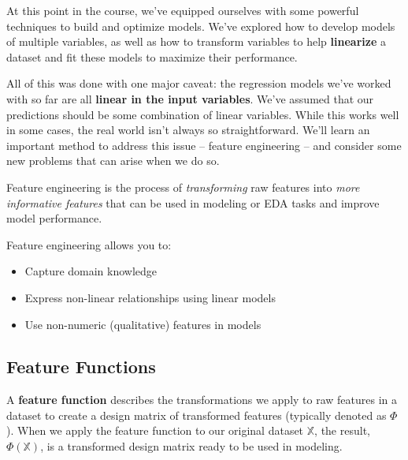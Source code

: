 \documentclass[
  letterpaper,
  DIV=11,
  numbers=noendperiod]{scrreprt}
\providecommand{\tightlist}{%
  \setlength{\itemsep}{0pt}\setlength{\parskip}{0pt}}\usepackage{longtable,booktabs,array}
\begin{document}
\begin{tcolorbox}[enhanced jigsaw, titlerule=0mm, bottomtitle=1mm, arc=.35mm, colframe=quarto-callout-tip-color-frame, rightrule=.15mm, opacityback=0, opacitybacktitle=0.6, leftrule=.75mm, breakable, toprule=.15mm, colback=white, left=2mm, colbacktitle=quarto-callout-tip-color!10!white, toptitle=1mm, bottomrule=.15mm, title=\textcolor{quarto-callout-tip-color}{\faLightbulb}\hspace{0.5em}{Motivation}, coltitle=black]

At this point in the course, we've equipped ourselves with some powerful
techniques to build and optimize models. We've explored how to develop
models of multiple variables, as well as how to transform variables to
help \textbf{linearize} a dataset and fit these models to maximize their
performance.

All of this was done with one major caveat: the regression models we've
worked with so far are all \textbf{linear in the input variables}. We've
assumed that our predictions should be some combination of linear
variables. While this works well in some cases, the real world isn't
always so straightforward. We'll learn an important method to address
this issue -- feature engineering -- and consider some new problems that
can arise when we do so.

\end{tcolorbox}

Feature engineering is the process of \emph{transforming} raw features
into \emph{more informative features} that can be used in modeling or
EDA tasks and improve model performance.

Feature engineering allows you to:

\begin{itemize}
\tightlist
\item
  Capture domain knowledge
\item
  Express non-linear relationships using linear models
\item
  Use non-numeric (qualitative) features in models
\end{itemize}

\subsection{Feature Functions}\label{feature-functions}

A \textbf{feature function} describes the transformations we apply to
raw features in a dataset to create a design matrix of transformed
features (typically denoted as \(\Phi\)). When we apply the feature
function to our original dataset \(\mathbb{X}\), the result,
\(\Phi(\mathbb{X})\), is a transformed design matrix ready to be used in
modeling.
\end{document}
